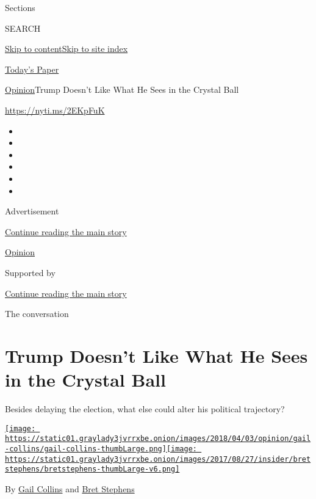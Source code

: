 Sections

SEARCH

\protect\hyperlink{site-content}{Skip to
content}\protect\hyperlink{site-index}{Skip to site index}

\href{https://myaccount.nytimes3xbfgragh.onion/auth/login?response_type=cookie\&client_id=vi}{}

\href{https://www.nytimes3xbfgragh.onion/section/todayspaper}{Today's
Paper}

\href{/section/opinion}{Opinion}\textbar{}Trump Doesn't Like What He
Sees in the Crystal Ball

\url{https://nyti.ms/2EKpFuK}

\begin{itemize}
\item
\item
\item
\item
\item
\item
\end{itemize}

Advertisement

\protect\hyperlink{after-top}{Continue reading the main story}

\href{/section/opinion}{Opinion}

Supported by

\protect\hyperlink{after-sponsor}{Continue reading the main story}

The conversation

\hypertarget{trump-doesnt-like-what-he-sees-in-the-crystal-ball}{%
\section{Trump Doesn't Like What He Sees in the Crystal
Ball}\label{trump-doesnt-like-what-he-sees-in-the-crystal-ball}}

Besides delaying the election, what else could alter his political
trajectory?

\href{https://www.nytimes3xbfgragh.onion/by/gail-collins}{\texttt{[image: https://static01.graylady3jvrrxbe.onion/images/2018/04/03/opinion/gail-collins/gail-collins-thumbLarge.png]}}\href{https://www.nytimes3xbfgragh.onion/by/bret-stephens}{\texttt{[image: https://static01.graylady3jvrrxbe.onion/images/2017/08/27/insider/bretstephens/bretstephens-thumbLarge-v6.png]}}

By \href{https://www.nytimes3xbfgragh.onion/by/gail-collins}{Gail
Collins} and
\href{https://www.nytimes3xbfgragh.onion/by/bret-stephens}{Bret
Stephens}

